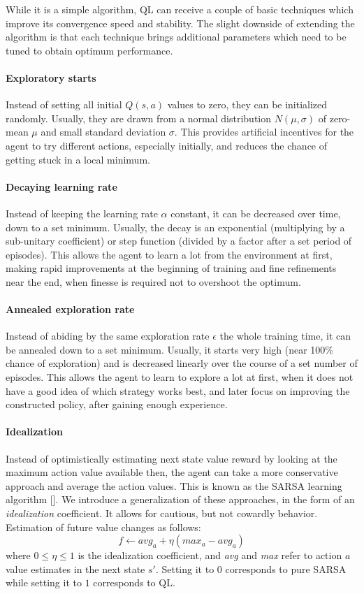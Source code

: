 \documentclass{article}
\begin{document}
While it is a simple algorithm, QL can receive a couple of basic techniques which improve its convergence speed and stability. The slight downside of extending the algorithm is that each technique brings additional parameters which need to be tuned to obtain optimum performance.

\paragraph{Exploratory starts} Instead of setting all initial $Q(s, a)$ values to zero, they can be initialized randomly. Usually, they are drawn from a normal distribution $N(\mu, \sigma)$ of zero-mean $\mu$ and small standard deviation $\sigma$. This provides artificial incentives for the agent to try different actions, especially initially, and reduces the chance of getting stuck in a local minimum.

\paragraph{Decaying learning rate} Instead of keeping the learning rate $\alpha$ constant, it can be decreased over time, down to a set minimum. Usually, the decay is an exponential (multiplying by a sub-unitary coefficient) or step function (divided by a factor after a set period of episodes). This allows the agent to learn a lot from the environment at first, making rapid improvements at the beginning of training and fine refinements near the end, when finesse is required not to overshoot the optimum.

\paragraph{Annealed exploration rate} Instead of abiding by the same exploration rate $\epsilon$ the whole training time, it can be annealed down to a set minimum. Usually, it starts very high (near 100\% chance of exploration) and is decreased linearly over the course of a set number of episodes. This allows the agent to learn to explore a lot at first, when it does not have a good idea of which strategy works best, and later focus on improving the constructed policy, after gaining enough experience.

\paragraph{Idealization} Instead of optimistically estimating next state value reward by looking at the maximum action value available then, the agent can take a more conservative approach and average the action values. This is known as the SARSA learning algorithm [\cite{sutton}]. We introduce a generalization of these approaches, in the form of an \textit{idealization} coefficient. It allows for cautious, but not cowardly behavior. Estimation of future value changes as follows:
$$f \leftarrow avg_a + \eta (max_a - avg_a) $$
where $0 \le \eta \le 1$ is the idealization coefficient, and \textit{avg} and \textit{max} refer to action $a$ value estimates in the next state $s'$.  Setting it to $0$ corresponds to pure SARSA while setting it to $1$ corresponds to QL.
\end{document}
